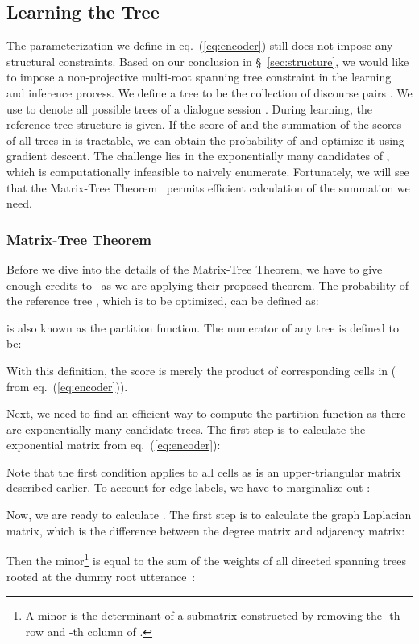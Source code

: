 \documentclass[11pt]{article}
\begin{document}
\subsection{Learning the Tree}
\label{sec:learning}
The parameterization we define in eq.~(\ref{eq:encoder}) still does not impose any structural constraints. Based on our conclusion in \S~\ref{sec:structure}, we would like to impose a non-projective multi-root spanning tree constraint in the learning and inference process.
We define a tree  to be the collection of discourse pairs .
We use  to denote all possible trees of a dialogue session . During learning, the reference tree structure  is given. If the score of  and the summation of the scores of all trees in  is tractable, we can obtain the probability of  and optimize it using gradient descent.
The challenge lies in the exponentially many candidates of , which is computationally infeasible to naively enumerate.
Fortunately, we will see that the Matrix-Tree Theorem~\cite{tutte1984graph,koo2007structured} permits efficient calculation of the summation we need.

\subsubsection{Matrix-Tree Theorem}
Before we dive into the details of the Matrix-Tree Theorem, we have to give enough credits to~\citet{tutte1984graph, koo2007structured} as we are applying their proposed theorem.
The probability of the reference tree  , which is to be optimized, can be defined as:

 is also known as the partition function.
The numerator  of any tree  is defined to be:

With this definition, the score is merely the product of corresponding cells in  ( from eq.~(\ref{eq:encoder})).

Next, we need to find an efficient way to compute the partition function as there are exponentially many candidate trees. The first step is to calculate the exponential matrix  from eq.~(\ref{eq:encoder}):

Note that the first  condition applies to all  cells as  is an upper-triangular matrix described earlier.
To account for edge labels, we have to marginalize  out :

Now, we are ready to calculate .
The first step is to calculate the graph Laplacian matrix, which is the difference between the degree matrix and adjacency matrix:

Then the minor\footnote{A minor  is the determinant of a submatrix constructed by removing the -th row and -th column of .}  is equal to the sum of the weights of all directed spanning trees rooted at the dummy root utterance~\cite{tutte1984graph}:
\end{document}
